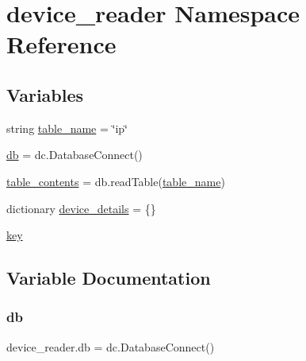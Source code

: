 \hypertarget{namespacedevice__reader}{}\section{device\+\_\+reader Namespace Reference}
\label{namespacedevice__reader}
\subsection*{Variables}
\begin{DoxyCompactItemize}
\item 
string \mbox{\hyperlink{namespacedevice__reader_aad8c1a079cd59349e6fe8da74a150b4c}{table\+\_\+name}} = \char`\"{}ip\char`\"{}
\item 
\mbox{\hyperlink{namespacedevice__reader_aef8ef243dde3f69875aa5ff4b68a35c9}{db}} = dc.\+Database\+Connect()
\item 
\mbox{\hyperlink{namespacedevice__reader_a5ee29ddcc8e6bbf93f8557da0f4a9853}{table\+\_\+contents}} = db.\+read\+Table(\mbox{\hyperlink{namespacedevice__reader_aad8c1a079cd59349e6fe8da74a150b4c}{table\+\_\+name}})
\item 
dictionary \mbox{\hyperlink{namespacedevice__reader_a05ed01d1cd5e9a1a511ee479e231f81c}{device\+\_\+details}} = \{\}
\item 
\mbox{\hyperlink{namespacedevice__reader_ad7cd4038fd9f67b2a6718b9bfb195a62}{key}}
\end{DoxyCompactItemize}


\subsection{Variable Documentation}
\mbox{\label{namespacedevice__reader_aef8ef243dde3f69875aa5ff4b68a35c9}} 
\subsubsection{\texorpdfstring{db}{db}}
{\footnotesize\ttfamily device\+\_\+reader.\+db = dc.\+Database\+Connect()}

\mbox{\label{namespacedevice__reader_a05ed01d1cd5e9a1a511ee479e231f81c}} 
